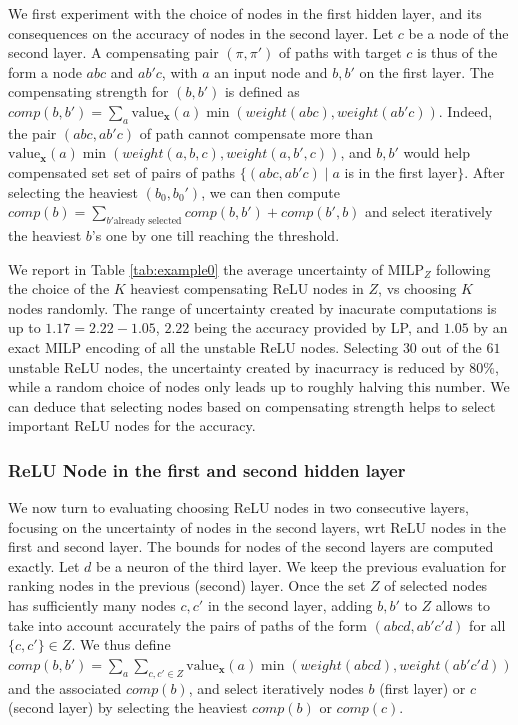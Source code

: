 \documentclass{llncs}
\newcommand{\vx}{\boldsymbol{x}}
\newcommand{\val}{{\textrm{value}}}
\newcommand{\MILP}{{\textrm{MILP}}}
\begin{document}
We first experiment with the choice of nodes in the first hidden layer, and its consequences on the accuracy of nodes in the second layer.  Let $c$ be a node of the second layer.
A compensating pair $(\pi,\pi')$ of paths with target $c$ is thus of the form a node $a b c$ and $a b' c$, with $a$ an input node and $b,b'$ on the first layer. The compensating strength for $(b,b')$ is defined as $comp(b,b')=\sum_a \val_{\vx}(a) \min(weight(abc),weight(ab'c))$. Indeed, the pair $(a b c,a b' c)$ of path cannot compensate more than $\val_{\vx}(a) \min(weight(a,b,c),weight(a,b',c))$, and $b,b'$ would help compensated set set of pairs of paths $\{(a b c,a b' c) \mid a$ is in the first layer$\}$. After selecting the heaviest $(b_0,b_0')$, we can then compute $comp(b)= \sum_{b' \text{already selected}} comp(b,b')+comp(b',b)$ and select iteratively the heaviest $b$'s one by one till reaching the threshold. 

We report in Table \ref{tab:example0} the average uncertainty of $\MILP_Z$ following the choice of the $K$ heaviest compensating ReLU nodes in $Z$, vs choosing $K$ nodes randomly. The range of uncertainty created by inacurate computations is up to $1.17=2.22-1.05$, $2.22$ being the accuracy provided by LP, and $1.05$ by an exact MILP encoding of all the unstable ReLU nodes. Selecting $30$ out of the $61$ unstable ReLU nodes, the uncertainty created by inacurracy is reduced by $80\%$, while a random choice of nodes only leads up to roughly halving this number. We can deduce that selecting nodes based on compensating strength helps to select important ReLU nodes for the accuracy.



\subsubsection*{ReLU Node in the first and second hidden layer}

We now turn to evaluating choosing ReLU nodes in two consecutive layers, focusing on the uncertainty of nodes in the second layers, wrt ReLU nodes in the first and second layer.
The bounds for nodes of the second layers are computed exactly. 
Let $d$ be a neuron of the third layer.
We keep the previous evaluation for ranking nodes in the previous (second) layer. 
Once the set $Z$ of selected nodes has sufficiently many nodes $c,c'$ in the second layer, adding $b,b'$ to $Z$ allows to take into account accurately the pairs of paths of the form $(a b c d, a b' c' d)$ for all $\{c,c'\} \in Z$. We thus define 
$comp(b,b')=\sum_a \sum_{c,c' \in Z} \val_{\vx}(a) \min(weight(abcd),weight(ab'c'd))$ and the associated $comp(b)$, and select iteratively nodes $b$ (first layer) or $c$ (second layer) by selecting the heaviest $comp(b)$ or $comp(c)$.
\end{document}
